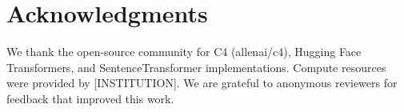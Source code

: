 \section*{Acknowledgments}

We thank the open-source community for C4 (allenai/c4), Hugging Face Transformers, and SentenceTransformer implementations. Compute resources were provided by [INSTITUTION]. We are grateful to anonymous reviewers for feedback that improved this work.
